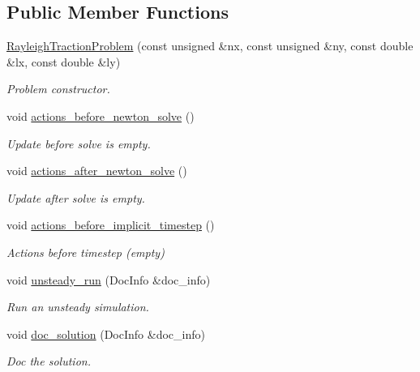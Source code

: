 \subsection*{Public Member Functions}
\begin{DoxyCompactItemize}
\item 
\hyperlink{classRayleighTractionProblem_a6be21517d8294957f768184a2d51844a}{Rayleigh\+Traction\+Problem} (const unsigned \&nx, const unsigned \&ny, const double \&lx, const double \&ly)
\begin{DoxyCompactList}\small\item\em Problem constructor. \end{DoxyCompactList}\item 
void \hyperlink{classRayleighTractionProblem_ad8f0e846280b0dd56f90c6d40808d3ea}{actions\+\_\+before\+\_\+newton\+\_\+solve} ()
\begin{DoxyCompactList}\small\item\em Update before solve is empty. \end{DoxyCompactList}\item 
void \hyperlink{classRayleighTractionProblem_ad85c20559eec76d54ebf666f62507d2e}{actions\+\_\+after\+\_\+newton\+\_\+solve} ()
\begin{DoxyCompactList}\small\item\em Update after solve is empty. \end{DoxyCompactList}\item 
void \hyperlink{classRayleighTractionProblem_aea3e470265c0e98a8b5bdabedd28eb82}{actions\+\_\+before\+\_\+implicit\+\_\+timestep} ()
\begin{DoxyCompactList}\small\item\em Actions before timestep (empty) \end{DoxyCompactList}\item 
void \hyperlink{classRayleighTractionProblem_a50871474406082ae1c1a1694e69e094b}{unsteady\+\_\+run} (Doc\+Info \&doc\+\_\+info)
\begin{DoxyCompactList}\small\item\em Run an unsteady simulation. \end{DoxyCompactList}\item 
void \hyperlink{classRayleighTractionProblem_a451af703b4a6de97b060884ca71c3ef8}{doc\+\_\+solution} (Doc\+Info \&doc\+\_\+info)
\begin{DoxyCompactList}\small\item\em Doc the solution. \end{DoxyCompactList}\item 

\end{DoxyCompactItemize}
